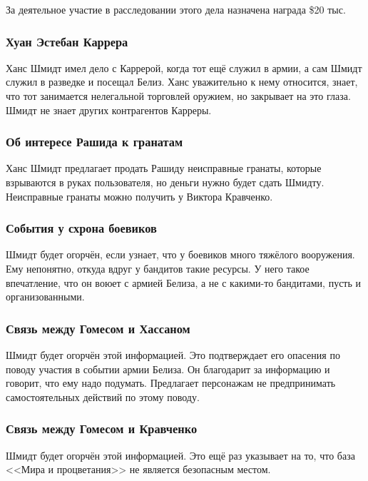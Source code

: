 \documentclass{article}
\begin{document}
За деятельное участие в расследовании этого дела назначена награда \$20
тыс.

\subsubsection{Хуан Эстебан
Каррера}\label{carrera-info}

Ханс Шмидт имел дело с Каррерой, когда тот ещё служил в армии, а сам
Шмидт служил в разведке и посещал Белиз. Ханс уважительно к нему
относится, знает, что тот занимается нелегальной торговлей оружием, но
закрывает на это глаза. Шмидт не знает других контрагентов Карреры.

\subsubsection{Об интересе Рашида к
гранатам}\label{rashid-grenades}

Ханс Шмидт предлагает продать Рашиду неисправные гранаты, которые
взрываются в руках пользователя, но деньги нужно будет сдать Шмидту.
Неисправные гранаты можно получить у Виктора Кравченко.

\subsubsection{События у схрона
боевиков}\label{hideout-events}

Шмидт будет огорчён, если узнает, что у боевиков много тяжёлого
вооружения. Ему непонятно, откуда вдруг у бандитов такие ресурсы. У него
такое впечатление, что он воюет с армией Белиза, а не с какими-то
бандитами, пусть и организованными.

\subsubsection{Связь между Гомесом и
Хассаном}\label{gomez-hassan-link}

Шмидт будет огорчён этой информацией. Это подтверждает его опасения по
поводу участия в событии армии Белиза. Он благодарит за информацию и
говорит, что ему надо подумать. Предлагает персонажам не предпринимать
самостоятельных действий по этому поводу.

\subsubsection{Связь между Гомесом и
Кравченко}\label{gomez-kravchenko-link}

Шмидт будет огорчён этой информацией. Это ещё раз указывает на то, что
база <<Мира и процветания>> не является безопасным местом.
\end{document}
